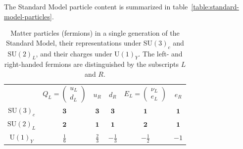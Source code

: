 The Standard Model particle content is summarized in table~\ref{table:standard-model-particles}. 


\begin{table}[htbp]
	\centering
	\begin{tabular}{cccccc}
		 & $Q_L=\left(\begin{array}{c} u_L \\ d_L \end{array}\right)$ & $u_R$ & $d_R$ & $E_L=\left(\begin{array}{c} \nu_L \\ e_L \end{array}\right) $ & $e_R$ \\
		$\mathrm{SU}(3)_c$ & $\mathbf{3}$ &  $\mathbf{3}$ & $\mathbf{3}$ & $\mathbf{1}$ & $\mathbf{1}$ \\
		$\mathrm{SU}(2)_L$ & $\mathbf{2}$ & $\mathbf{1}$ & $\mathbf{1}$ & $\mathbf{2}$ & $\mathbf{1}$ \\
		$\mathrm{U}(1)_Y$ & $\frac16$ & $\frac23$ & $-\frac13$ & $-\frac12$ & $-1$ \\
	\end{tabular}
	\caption{Matter particles (fermions) in a single generation of the Standard Model, their representations under $\mathrm{SU}(3)_c$ and $\mathrm{SU}(2)_L$, and their charges under $\mathrm{U}(1)_Y$. The left- and right-handed fermions are distinguished by the subscripts $L$ and $R$.}
	\label{table:standard-model-fermions}
\end{table}

